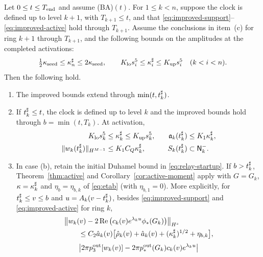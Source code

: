 \begin{proposition}
\label{prop:relay-step}
Let $0\le t\le T_{\mathrm{end}}$ and assume (BA)$(t)$. For $1\le k<n$, suppose the clock is
defined up to level $k+1$, with $T_{k+1}\le t$, and that
\eqref{eq:improved-support}--\eqref{eq:improved-active} hold through $T_{k+1}$.
Assume the conclusions in item~(c) for ring $k+1$ through $T_{k+1}$,
and the following bounds on the amplitudes at the completed activations:
\begin{equation}
\label{eq:relay-amplitudes}
\tfrac12\kappa_{\mathrm{seed}}\le\kappa^\sharp_n\le2\kappa_{\mathrm{seed}},\qquad
K_{\mathrm{lo}} s_i^5\le\kappa^\sharp_i\le K_{\mathrm{up}} s_i^5\quad(k<i<n).
\end{equation}
Then the following hold.
\begin{enumerate}[label=\textup{(\alph*)}]
\item The improved bounds extend through $\min(t,t^\sharp_k)$.
\item If $t^\sharp_k\le t$, the clock is defined up to level $k$ and the
improved bounds hold through $b=\min(t,T_k)$. At activation,
\begin{equation}
\label{eq:relay-startup}
\begin{aligned}
K_{\mathrm{lo}} s_k^5&\le\kappa^\sharp_k\le K_{\mathrm{up}} s_k^5,
&\quad \mathfrak{a}_k(t^\sharp_k)&\le K_1\kappa^\sharp_k,\\
\|w_k(t^\sharp_k)\|_{H^{M-1}}&\le K_1 C_Q\kappa^\sharp_k,
& S_k(t^\sharp_k)&\subset\mathsf{N}^{-}_k.
\end{aligned}
\end{equation}
\item In case (b), retain the initial Duhamel bound in
\eqref{eq:relay-startup}. If $b>t^\sharp_k$, Theorem~\ref{thm:active} and
Corollary~\ref{cor:active-moment} apply with $G=G_k$, $\kappa=\kappa^\sharp_k$ and
$\eta_b=\eta_{b,k}$ of \eqref{eq:etab} (with $\eta_{b,1}=0$).
More explicitly, for $t^\sharp_k\le v\le b$ and $u=A_k(v-t^\sharp_k)$, besides
\eqref{eq:improved-support} and \eqref{eq:improved-active} for ring $k$,
\begin{equation}
\label{eq:relay-active}
\begin{aligned}
&\big\|w_k(v)-2\Re\big(c_k(v)e^{\lambda_k u}\phi_*(G_k)\big)\big\|_{H^s}\\
&\qquad\le C_2\hat a_k(v)
\big[\hat\rho_k(v)+\hat a_k(v)+(\kappa^\sharp_k)^{1/2}+\eta_{b,k}\big],
\end{aligned}
\end{equation}
\begin{equation}
\label{eq:relay-active-moment}
\begin{aligned}
&\big|2\pi\pout_3[w_k(v)]-2\pi\pout_*(G_k)c_k(v)e^{\lambda_k u}\big|\\

\end{aligned}
\end{equation}
\end{enumerate}
\end{proposition}
